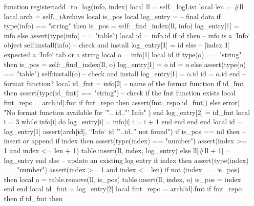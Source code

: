\begin{lines}
function register:add_to_log(info, index)
    local ll = self._logList
    local len = #ll
    local arch = self._iArchive
    local is_pos
    local log_entry = {} -- final data
    if type(info) == "string" then
        is_pos = self:_find_index(ll, info)
        log_entry[1] = info
    else
        assert(type(info) == "table")
        local id = info.id
        if id then -- info is a `Info` object
            self:install(info) -- check and install
            log_entry[1] = id
        else
            -- [index 1] expected a `Info` tab or a string
            local o = info[1]
            local id
            if type(o) == "string" then
                is_pos = self:_find_index(ll, o)
                log_entry[1] = o
                id = o
            else
                assert(type(o) == "table")
                self:install(o) -- check and install
                log_entry[1] = o.id
                id = o.id
            end
            -- format function?
            local id_fmt = info[2] -- name of the format function
            if id_fmt then
                assert(type(id_fmt) == "string")
                -- check if the fmt function exists
                local fmt_repo = arch[id].fmt
                if fmt_repo then
                    assert(fmt_repo[id_fmt])
                else
                    error(
                        "No format function available for '"..
                        id.."' Info"
                    )
                end
                log_entry[2] = id_fmt
                local i = 3
                while info[i] do
                    log_entry[i] = info[i]
                    i = i + 1
                end
            end
        end
    end
    local id = log_entry[1]
    assert(arch[id], "`Info` id '"..id.."' not found")
    if is_pos == nil then -- insert or append
        if index then
            assert(type(index) == "number")
            assert(index >= 1 and index <= len + 1)
            table.insert(ll, index, log_entry)
        else
            ll[#ll + 1] = log_entry
        end
    else -- update an existing log entry
        if index then
            assert(type(index) == "number")
            assert(index >= 1 and index <= len)
            if not (index == is_pos) then
                local o = table.remove(ll, is_pos)
                table.insert(ll, index, o)
                is_pos = index
            end
        end
        local id_fmt = log_entry[2]
        local fmt_repo = arch[id].fmt
        if fmt_repo then
            if id_fmt then

\end{lines}
